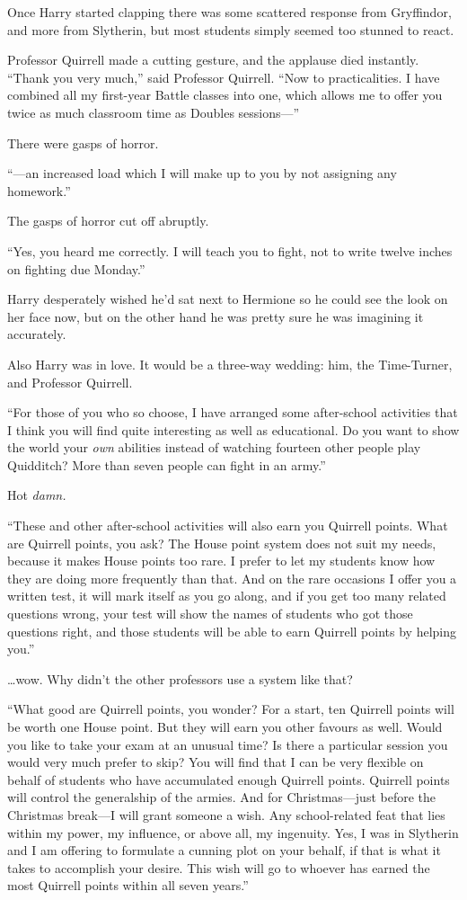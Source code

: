 Once Harry started clapping there was some scattered response from
Gryffindor, and more from Slytherin, but most students simply seemed too
stunned to react.

Professor Quirrell made a cutting gesture, and the applause died
instantly. ``Thank you very much,'' said Professor Quirrell. ``Now to
practicalities. I have combined all my first-year Battle classes into
one, which allows me to offer you twice as much classroom time as
Doubles sessions---''

There were gasps of horror.

``---an increased load which I will make up to you by not assigning any
homework.''

The gasps of horror cut off abruptly.

``Yes, you heard me correctly. I will teach you to fight, not to write
twelve inches on fighting due Monday.''

Harry desperately wished he'd sat next to Hermione so he could see the
look on her face now, but on the other hand he was pretty sure he was
imagining it accurately.

Also Harry was in love. It would be a three-way wedding: him, the
Time-Turner, and Professor Quirrell.

``For those of you who so choose, I have arranged some after-school
activities that I think you will find quite interesting as well as
educational. Do you want to show the world your \emph{own} abilities
instead of watching fourteen other people play Quidditch? More than
seven people can fight in an army.''

Hot \emph{damn.}

``These and other after-school activities will also earn you Quirrell
points. What are Quirrell points, you ask? The House point system does
not suit my needs, because it makes House points too rare. I prefer to
let my students know how they are doing more frequently than that. And
on the rare occasions I offer you a written test, it will mark itself as
you go along, and if you get too many related questions wrong, your test
will show the names of students who got those questions right, and those
students will be able to earn Quirrell points by helping you.''

\ldots{}wow. Why didn't the other professors use a system like that?

``What good are Quirrell points, you wonder? For a start, ten Quirrell
points will be worth one House point. But they will earn you other
favours as well. Would you like to take your exam at an unusual time? Is
there a particular session you would very much prefer to skip? You will
find that I can be very flexible on behalf of students who have
accumulated enough Quirrell points. Quirrell points will control the
generalship of the armies. And for Christmas---just before the Christmas
break---I will grant someone a wish. Any school-related feat that lies
within my power, my influence, or above all, my ingenuity. Yes, I was in
Slytherin and I am offering to formulate a cunning plot on your behalf,
if that is what it takes to accomplish your desire. This wish will go to
whoever has earned the most Quirrell points within all seven years.''

